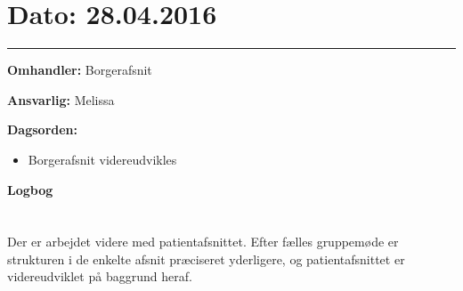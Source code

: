 

\section{Dato: 28.04.2016}
\hrule

\textbf{Omhandler:} Borgerafsnit

\textbf{Ansvarlig:} Melissa

\textbf{Dagsorden:}
\begin{itemize}
	\item Borgerafsnit videreudvikles
\end{itemize}

\textbf{Logbog}
\\
\\ \\
Der er arbejdet videre med patientafsnittet. Efter fælles gruppemøde er strukturen i de enkelte afsnit præciseret yderligere, og patientafsnittet er videreudviklet på baggrund heraf. 




